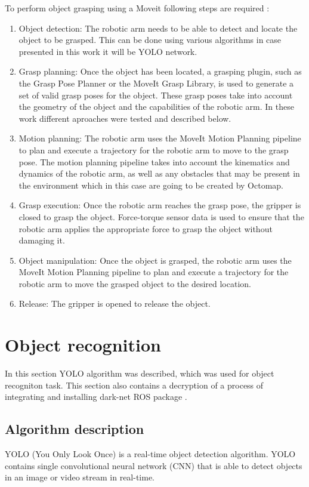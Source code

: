 \documentclass[conference,a4paper]{IEEEtran}
\begin{document}
 To perform object grasping using a Moveit following steps are required : 
 \begin{enumerate}
  \item Object detection: The robotic arm needs to be able to detect and locate the object to be grasped. This can be done using various algorithms in case presented in this work it will be YOLO network.
  \item Grasp planning: Once the object has been located, a grasping plugin, such as the Grasp Pose Planner or the MoveIt Grasp Library, is used to generate a set of valid grasp poses for the object. These grasp poses take into account the geometry of the object and the capabilities of the robotic arm. In these work different aproaches were tested and described below.
  \item Motion planning: The robotic arm uses the MoveIt Motion Planning pipeline to plan and execute a trajectory for the robotic arm to move to the grasp pose. The motion planning pipeline takes into account the kinematics and dynamics of the robotic arm, as well as any obstacles that may be present in the environment which in this case are going to be created by Octomap.
  \item Grasp execution: Once the robotic arm reaches the grasp pose, the gripper is closed to grasp the object. Force-torque sensor data is used to ensure that the robotic arm applies the appropriate force to grasp the object without damaging it.
  \item Object manipulation: Once the object is grasped, the robotic arm uses the MoveIt Motion Planning pipeline to plan and execute a trajectory for the robotic arm to move the grasped object to the desired location.
  \item Release: The gripper is opened to release the object.
 \end{enumerate}


\section{Object recognition}
In this section YOLO algorithm was described, which was used for object recogniton task. This section also contains a decryption of a process of integrating and installing dark-net ROS package \cite{YOLO_ROS}.

\subsection{Algorithm description}
YOLO (You Only Look Once) is a real-time object detection algorithm. YOLO contains single convolutional neural network (CNN) that is able to detect objects in an image or video stream in real-time. 
\end{document}
